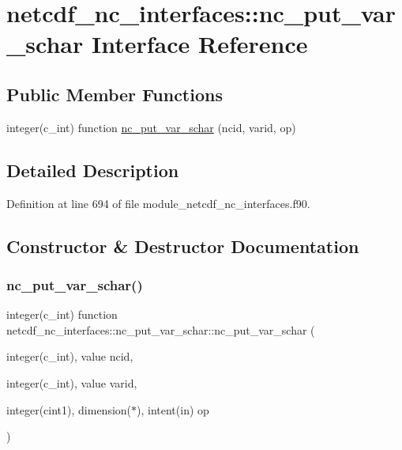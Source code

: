 \hypertarget{interfacenetcdf__nc__interfaces_1_1nc__put__var__schar}{}\section{netcdf\+\_\+nc\+\_\+interfaces\+:\+:nc\+\_\+put\+\_\+var\+\_\+schar Interface Reference}
\label{interfacenetcdf__nc__interfaces_1_1nc__put__var__schar}
\subsection*{Public Member Functions}
\begin{DoxyCompactItemize}
\item 
integer(c\+\_\+int) function \hyperlink{interfacenetcdf__nc__interfaces_1_1nc__put__var__schar_ade377de60db2adfe51296ed3cf244b29}{nc\+\_\+put\+\_\+var\+\_\+schar} (ncid, varid, op)
\end{DoxyCompactItemize}


\subsection{Detailed Description}


Definition at line 694 of file module\+\_\+netcdf\+\_\+nc\+\_\+interfaces.\+f90.



\subsection{Constructor \& Destructor Documentation}
\mbox{\label{interfacenetcdf__nc__interfaces_1_1nc__put__var__schar_ade377de60db2adfe51296ed3cf244b29}} 
\subsubsection{\texorpdfstring{nc\+\_\+put\+\_\+var\+\_\+schar()}{nc\_put\_var\_schar()}}
{\footnotesize\ttfamily integer(c\+\_\+int) function netcdf\+\_\+nc\+\_\+interfaces\+::nc\+\_\+put\+\_\+var\+\_\+schar\+::nc\+\_\+put\+\_\+var\+\_\+schar (\begin{DoxyParamCaption}\item[{integer(c\+\_\+int), value}]{ncid,  }\item[{integer(c\+\_\+int), value}]{varid,  }\item[{integer(cint1), dimension($\ast$), intent(in)}]{op }\end{DoxyParamCaption})}



